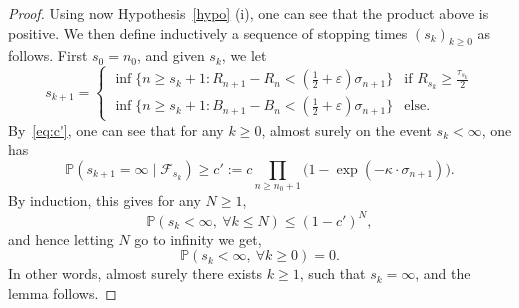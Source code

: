 \documentclass[11pt]{article}
\newcommand{\1}{{\text{\Large $\mathfrak 1$}}}
\begin{document}
\begin{proof}
Using now Hypothesis~\ref{hypo} (i), one can see that the product above is positive. We then define inductively a sequence of stopping times $(s_k)_{k\ge 0}$ as follows. First $s_0 = n_0$, 
and given $s_k$, we let 
\begin{equation*}
s_{k+1} = \left\{ 
\begin{array}{ll}
\inf\{n \ge s_k+1 : R_{n+1} - R_n < (\frac 12 + \varepsilon) \sigma_{n+1}\} & \text{if }R_{s_k}\ge \frac{\tau_{s_k}}{2} \\
 \inf\{n \ge s_k+1 : B_{n+1} - B_n < (\frac 12 + \varepsilon) \sigma_{n+1}\} & \text{else.} 
\end{array}
\right. 
\end{equation*}
By~\eqref{eq:c'}, one can see that for any $k\ge 0$, almost surely on the event $s_k<\infty$, one has 
$$\mathbb P(s_{k+1} = \infty \mid \mathcal F_{s_k}) \ge c':=  c \prod_{n\ge n_0+1} \big(1-\exp(- \kappa \cdot\sigma_{n+1})\big). $$ 
By induction, this gives for any $N\ge 1$,
$$\mathbb P(s_k<\infty, \ \forall k\le N) \le (1- c')^N,$$
and hence letting $N$ go to infinity we get, 
$$\mathbb P(s_k<\infty, \ \forall k\ge 0) = 0. $$ 
In other words, almost surely there exists $k\ge 1$, such that $s_k= \infty$, and the lemma follows.   
\end{proof}
\end{document}
